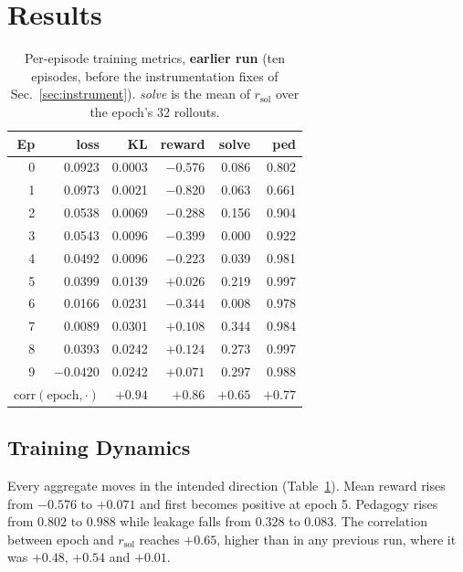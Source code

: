 \documentclass[conference]{IEEEtran}
\begin{document}
\section{Results}
\label{sec:results}

\begin{table}[t]
\caption{Per-episode training metrics, \textbf{earlier run} (ten episodes, before the instrumentation fixes of Sec.~\ref{sec:instrument}). \emph{solve} is the mean of
$r_{\mathrm{sol}}$ over the epoch's 32 rollouts.}
\label{tab:epochs}
\centering
\small
\begin{tabular}{rrrrrr}
\toprule
\textbf{Ep} & \textbf{loss} & \textbf{KL} & \textbf{reward} &
\textbf{solve} & \textbf{ped} \\
\midrule
0 & 0.0923 & 0.0003 & $-0.576$ & 0.086 & 0.802 \\
1 & 0.0973 & 0.0021 & $-0.820$ & 0.063 & 0.661 \\
2 & 0.0538 & 0.0069 & $-0.288$ & 0.156 & 0.904 \\
3 & 0.0543 & 0.0096 & $-0.399$ & 0.000 & 0.922 \\
4 & 0.0492 & 0.0096 & $-0.223$ & 0.039 & 0.981 \\
5 & 0.0399 & 0.0139 & $+0.026$ & 0.219 & 0.997 \\
6 & 0.0166 & 0.0231 & $-0.344$ & 0.008 & 0.978 \\
7 & 0.0089 & 0.0301 & $+0.108$ & 0.344 & 0.984 \\
8 & 0.0393 & 0.0242 & $+0.124$ & 0.273 & 0.997 \\
9 & $-0.0420$ & 0.0242 & $+0.071$ & 0.297 & 0.988 \\
\midrule
\multicolumn{2}{l}{$\mathrm{corr}(\text{epoch},\cdot)$}
 & $+0.94$ & $+0.86$ & $+0.65$ & $+0.77$ \\
\bottomrule
\end{tabular}
\end{table}



\subsection{Training Dynamics}

Every aggregate moves in the intended direction
(Table~\ref{tab:epochs}). Mean reward rises from
$-0.576$ to $+0.071$ and first becomes positive at epoch 5. Pedagogy rises
from $0.802$ to $0.988$ while leakage falls from $0.328$ to $0.083$. The
correlation between epoch and $r_{\mathrm{sol}}$ reaches $+0.65$, higher
than in any previous run, where it was $+0.48$, $+0.54$ and $+0.01$.
\end{document}
